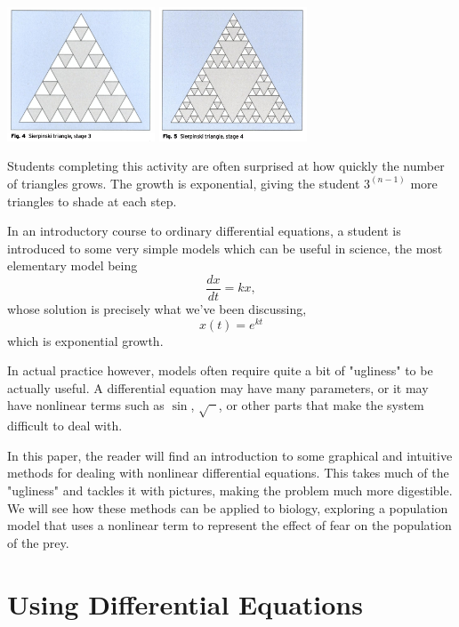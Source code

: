 \documentclass[man, 12pt]{apa6}
\begin{document}
\begin{center}
\includegraphics[width=0.33\textwidth]{sierp_fig_4}
\includegraphics[width=0.33\textwidth]{sierp_fig_5}
\end{center}
Students completing this activity are often surprised at how quickly the number of triangles grows. The growth is exponential, giving the student $3^{(n-1)}$ more triangles to shade at each step. 

In an introductory course to ordinary differential equations, a student is introduced to some very simple models which can be useful in science, the most elementary model being 
$$\frac{dx}{dt}=kx,$$
whose solution is precisely what we've been discussing, 
$$x(t)=e^{kt}$$
which is exponential growth. 

In actual practice however, models often require quite a bit of "ugliness" to be actually useful. A differential equation may have many parameters, or it may have nonlinear terms such as $\sin$, $\sqrt{\phantom{x}}$, or other parts that make the system difficult to deal with. 

In this paper, the reader will find an introduction to some
graphical and intuitive methods for dealing with nonlinear differential equations. This takes much of the "ugliness" and tackles it with pictures, making the problem much more digestible. We will see how these methods can be applied to biology, exploring a population model that uses a nonlinear term to represent the effect of fear on the population of the prey. 

\section{Using Differential Equations}
\end{document}
